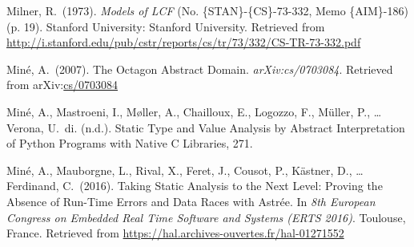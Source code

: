 \documentclass[12pt,twoside]{article}
\begin{document}
{\begin{thebibliography}{1079}
\mdbibitemlabel{}Milner, R.~(1973). \emph{Models of LCF} (No. \{STAN\}-\{CS\}-73-332, Memo \{AIM\}-186) (p. 19). Stanford University: Stanford University. Retrieved from \href{http://i.stanford.edu/pub/cstr/reports/cs/tr/73/332/CS-TR-73-332.pdf}{{\ttfamily http://\hspace{0pt}i.\hspace{0pt}stanford.\hspace{0pt}edu/\hspace{0pt}pub/\hspace{0pt}cstr/\hspace{0pt}reports/\hspace{0pt}cs/\hspace{0pt}tr/\hspace{0pt}73/\hspace{0pt}332/\hspace{0pt}CS-\hspace{0pt}TR-\hspace{0pt}73-\hspace{0pt}332.\hspace{0pt}pdf}}%

\mdbibitemlabel{}Miné, A.~(2007). The Octagon Abstract Domain. \emph{arXiv:cs/0703084}. Retrieved from arXiv:\href{http://arxiv.org/abs/cs/0703084}{cs/0703084}%

\mdbibitemlabel{}Miné, A., Mastroeni, I., Møller, A., Chailloux, E., Logozzo, F., Müller, P., … Verona, U.~di. (n.d.). Static Type and Value Analysis by Abstract Interpretation of Python Programs with Native C Libraries, 271.%

\mdbibitemlabel{}Miné, A., Mauborgne, L., Rival, X., Feret, J., Cousot, P., Kästner, D., … Ferdinand, C.~(2016). Taking Static Analysis to the Next Level: Proving the Absence of Run-Time Errors and Data Races with Astrée. In \emph{8th European Congress on Embedded Real Time Software and Systems (ERTS 2016)}. Toulouse, France. Retrieved from \href{https://hal.archives-ouvertes.fr/hal-01271552}{{\ttfamily https://\hspace{0pt}hal.\hspace{0pt}archives-\hspace{0pt}ouvertes.\hspace{0pt}fr/\hspace{0pt}hal-\hspace{0pt}01271552}}%


\end{thebibliography}}
\end{document}
